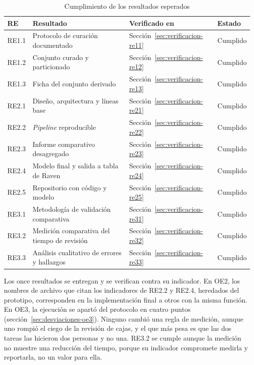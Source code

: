 \begin{table}[htbp]
    \centering
    \caption{Cumplimiento de los resultados esperados}
    \label{tab:cumplimiento}
    \small
    \begin{tabular}{@{}lL{7.2cm}L{3.4cm}l@{}}
        \toprule
        \textbf{RE} & \textbf{Resultado} & \textbf{Verificado en} & \textbf{Estado} \\
        \midrule
        RE1.1 & Protocolo de curación documentado        & Sección~\ref{sec:verificacion-re11} & Cumplido \\
        RE1.2 & Conjunto curado y particionado           & Sección~\ref{sec:verificacion-re12} & Cumplido \\
        RE1.3 & Ficha del conjunto derivado              & Sección~\ref{sec:verificacion-re13} & Cumplido \\
        \addlinespace
        RE2.1 & Diseño, arquitectura y líneas base       & Sección~\ref{sec:verificacion-re21} & Cumplido \\
        RE2.2 & \textit{Pipeline} reproducible           & Sección~\ref{sec:verificacion-re22} & Cumplido \\
        RE2.3 & Informe comparativo desagregado          & Sección~\ref{sec:verificacion-re23} & Cumplido \\
        RE2.4 & Modelo final y salida a tabla de Raven   & Sección~\ref{sec:verificacion-re24} & Cumplido \\
        RE2.5 & Repositorio con código y modelo          & Sección~\ref{sec:verificacion-re25} & Cumplido \\
        \addlinespace
        RE3.1 & Metodología de validación comparativa    & Sección~\ref{sec:verificacion-re31} & Cumplido \\
        RE3.2 & Medición comparativa del tiempo de revisión & Sección~\ref{sec:verificacion-re32} & Cumplido \\
        RE3.3 & Análisis cualitativo de errores y hallazgos & Sección~\ref{sec:verificacion-re33} & Cumplido \\
        \bottomrule
    \end{tabular}
\end{table}

Los once resultados se entregan y se verifican contra su indicador. En OE2, los
nombres de archivo que citan los indicadores de RE2.2 y RE2.4, heredados del
prototipo, corresponden en la implementación final a otros con la misma función.
En OE3, la ejecución se apartó del protocolo en cuatro puntos
(sección~\ref{sec:desviaciones-oe3}). Ninguno cambió una regla de medición,
aunque uno rompió el ciego de la revisión de cajas, y el que más pesa es que las
dos tareas las hicieron dos personas y no una. RE3.2 se cumple aunque la medición
no muestre una reducción del tiempo, porque su indicador compromete medirla y
reportarla, no un valor para ella.

